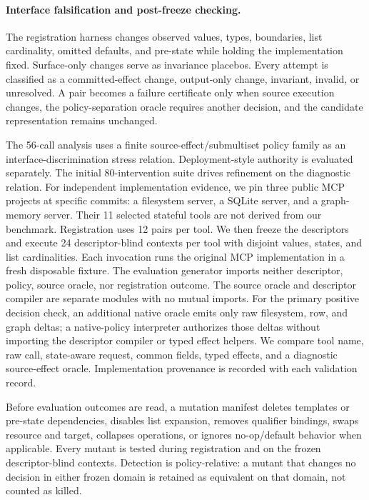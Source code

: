 \paragraph{Interface falsification and post-freeze checking.}
The registration harness changes observed values, types, boundaries, list
cardinality, omitted defaults, and pre-state while holding the implementation
fixed. Surface-only changes serve as invariance placebos. Every attempt is
classified as a committed-effect change, output-only change, invariant,
invalid, or unresolved. A pair becomes a failure certificate only when source
execution changes, the policy-separation oracle requires another decision, and
the candidate representation remains unchanged.

The 56-call analysis uses a finite source-effect/submultiset policy family as
an interface-discrimination stress relation. Deployment-style authority is
evaluated separately. The initial 80-intervention suite drives refinement on
the diagnostic relation.
For independent implementation evidence, we pin three public MCP projects at
specific commits: a filesystem server, a SQLite server, and a graph-memory
server. Their 11 selected stateful tools are not derived from our benchmark.
Registration uses 12 pairs per tool. We then freeze the descriptors and execute
24 descriptor-blind contexts per tool with disjoint values, states, and list
cardinalities. Each invocation runs the original MCP implementation in a fresh
disposable fixture. The evaluation generator imports neither descriptor,
policy, source oracle, nor registration outcome. The source oracle and
descriptor compiler are separate modules with no mutual imports. For the
primary positive decision check, an additional native oracle emits only raw
filesystem, row, and graph deltas; a native-policy interpreter authorizes those
deltas without importing the descriptor compiler or typed effect helpers. We compare
tool name, raw call, state-aware request, common fields, typed effects, and a
diagnostic source-effect oracle. Implementation provenance is recorded with
each validation record.

Before evaluation outcomes are read, a mutation manifest deletes templates or
pre-state dependencies, disables list expansion, removes qualifier bindings,
swaps resource and target, collapses operations, or ignores no-op/default
behavior when applicable. Every mutant is tested during registration and on
the frozen descriptor-blind contexts. Detection is policy-relative: a mutant
that changes no decision in either frozen domain is retained as equivalent on
that domain, not counted as killed.


